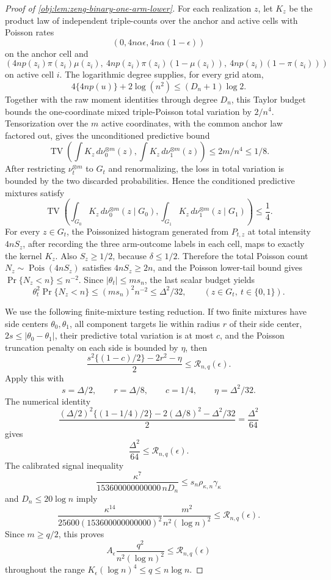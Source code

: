 \documentclass[11pt]{article}
\begin{document}
\begin{proof}[Proof of \cref{obj:lem:zeng-binary-one-arm-lower}]
For each realization \(z\), let \(K_z\) be the product law of independent triple-counts over the anchor and active cells with Poisson rates
\[
(0,4n\alpha\epsilon,4n\alpha(1-\epsilon))
\]
on the anchor cell and
\[
(4n p(z_i)\pi(z_i)\mu(z_i),\ 4n p(z_i)\pi(z_i)(1-\mu(z_i)),\ 4n p(z_i)(1-\pi(z_i)))
\]
on active cell \(i\).  The logarithmic degree supplies, for every grid atom,
\[
4\{4n p(u)\}+2\log(n^2)
\le (D_n+1)\log 2 .
\]
Together with the raw moment identities through degree \(D_n\), this Taylor budget bounds the one-coordinate mixed triple-Poisson total variation by \(2/n^4\).  Tensorization over the \(m\) active coordinates, with the common anchor law factored out, gives the unconditioned predictive bound
\[
\operatorname{TV}\left(
\int K_z\,d\nu_0^{\otimes m}(z),
\int K_z\,d\nu_1^{\otimes m}(z)
\right)
\le 2m/n^4\le 1/8 .
\]
After restricting \(\nu_t^{\otimes m}\) to \(G_t\) and renormalizing, the loss in total variation is bounded by the two discarded probabilities.  Hence the conditioned predictive mixtures satisfy
\[
\operatorname{TV}\left(
\int_{G_0} K_z\,d\nu_0^{\otimes m}(z\mid G_0),
\int_{G_1} K_z\,d\nu_1^{\otimes m}(z\mid G_1)
\right)
\le \frac14 .
\]
For every \(z\in G_t\), the Poissonized histogram generated from \(P_{t,z}\) at total intensity \(4nS_z\), after recording the three arm-outcome labels in each cell, maps to exactly the kernel \(K_z\).  Also \(S_z\ge1/2\), because \(\delta\le1/2\).  Therefore the total Poisson count \(N_z\sim\operatorname{Pois}(4nS_z)\) satisfies \(4nS_z\ge2n\), and the Poisson lower-tail bound gives \(\Pr\{N_z<n\}\le n^{-2}\).  Since \(|\theta_t|\le m s_n\), the last scalar budget yields
\[
\theta_t^2\Pr\{N_z<n\}
\le
(m s_n)^2 n^{-2}
\le
\Delta^2/32,
\qquad (z\in G_t,
\ t\in\{0,1\}).
\]

We use the following finite-mixture testing reduction.  If two finite mixtures have side centers \(\theta_0,\theta_1\), all component targets lie within radius \(r\) of their side center, \(2s\le |\theta_0-\theta_1|\), their predictive total variation is at most \(c\), and the Poisson truncation penalty on each side is bounded by \(\eta\), then
\[
\frac{s^2\{(1-c)/2\}-2r^2-\eta}{2}
\le
\mathcal R_{n,q}(\epsilon).
\]
Apply this with
\[
s=\Delta/2,
\qquad
r=\Delta/8,
\qquad
c=1/4,
\qquad
\eta=\Delta^2/32 .
\]
The numerical identity
\[
\frac{(\Delta/2)^2\{(1-1/4)/2\}-2(\Delta/8)^2-\Delta^2/32}{2}
=\frac{\Delta^2}{64}
\]
gives
\[
\frac{\Delta^2}{64}
\le
\mathcal R_{n,q}(\epsilon).
\]
The calibrated signal inequality
\[
\frac{\kappa^7}{153600000000000\, nD_n}
\le s_n\rho_{\kappa,n}\gamma_\kappa
\]
and \(D_n\le20\log n\) imply
\[
\frac{\kappa^{14}}{25600(153600000000000)^2}
\frac{m^2}{n^2(\log n)^2}
\le \mathcal R_{n,q}(\epsilon).
\]
Since \(m\ge q/2\), this proves
\[
A_\epsilon\frac{q^2}{n^2(\log n)^2}
\le \mathcal R_{n,q}(\epsilon)
\]
throughout the range \(K_\epsilon(\log n)^4\le q\le n\log n\).


\end{proof}
\end{document}
